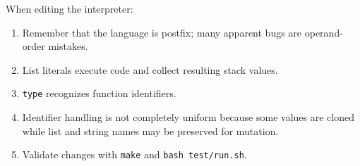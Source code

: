 \documentclass[11pt,a4paper]{article}
\newcommand{\code}[1]{\texttt{#1}}
\begin{document}
When editing the interpreter:

\begin{enumerate}
\item Remember that the language is postfix; many apparent bugs are
operand-order mistakes.
\item List literals execute code and collect resulting stack values.
\item \code{type} recognizes function identifiers.
\item Identifier handling is not completely uniform because some values
are cloned while list and string names may be preserved for mutation.
\item Validate changes with \code{make} and \code{bash test/run.sh}.
\end{enumerate}
\end{document}
